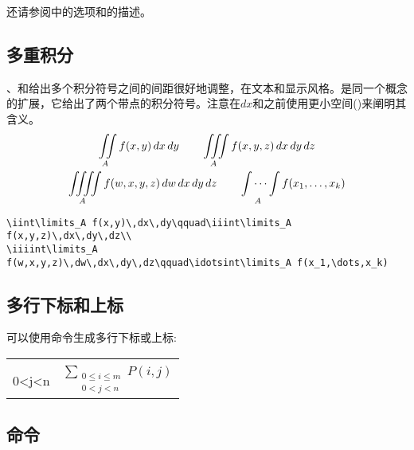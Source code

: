 还请参阅\cite{amsldoc}中的选项和的描述。

\subsection{多重积分}

、和给出多个积分符号之间的间距很好地调整，在文本和显示风格。是同一个概念的扩展，它给出了两个带点的积分符号。注意在$dx$和之前使用更小空间()来阐明其含义。
\begin{gather}
\iint\limits_A f(x,y)\,dx\,dy\qquad\iiint\limits_A
f(x,y,z)\,dx\,dy\,dz\\
\iiiint\limits_A
f(w,x,y,z)\,dw\,dx\,dy\,dz\qquad\idotsint\limits_A f(x_1,\dots,x_k)
\end{gather}
\begin{verbatim}
\iint\limits_A f(x,y)\,dx\,dy\qquad\iiint\limits_A
f(x,y,z)\,dx\,dy\,dz\\
\iiiint\limits_A
f(w,x,y,z)\,dw\,dx\,dy\,dz\qquad\idotsint\limits_A f(x_1,\dots,x_k)
\end{verbatim}

\subsection{多行下标和上标}

可以使用命令生成多行下标或上标:\relax {}
\begin{center}
\begin{tabular}{ll}
\begin{minipage}[t]{.6\columnwidth}
\begin{verbatim}
\sum_{\substack{
         0\le i\le m\\
         0<j<n}}
  P(i,j)
\end{verbatim}
\end{minipage}
&
$\displaystyle
\sum_{\substack{0\le i\le m\\ 0<j<n}} P(i,j)$
\end{tabular}
\end{center}

\subsection{ 命令}\label{sideset}

